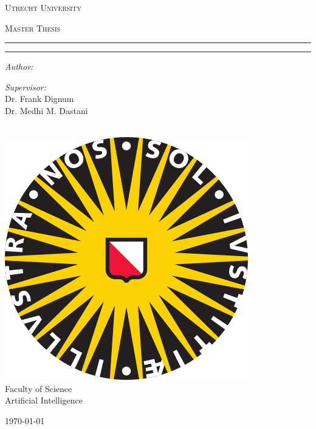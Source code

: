 \makeatletter
\begin{titlepage}
\begin{center}

\vspace*{.06\textheight}
{\scshape\LARGE Utrecht University\par}\vspace{1.5cm} %
\textsc{\Large Master Thesis}\\[0.5cm] %

\hrule
\vspace{0.2cm}
{\huge \bfseries \@title \par}
\vspace{0.4cm} %
\hrule
\vspace{0.2cm}

\begin{minipage}[t]{0.4\textwidth}
\begin{flushleft} \large
\emph{Author:}\\
\@author %
\end{flushleft}
\end{minipage}
\begin{minipage}[t]{0.4\textwidth}
\begin{flushright} \large
\emph{Supervisor:} \\
Dr. Frank Dignum \\
Dr. Medhi M. Dastani
\end{flushright}
\end{minipage}\\[1.5cm]
 
\includegraphics{logo} %
\\[1.0cm]

Faculty of Science \\
Artificial Intelligence\\[2cm] %
 
\vfill

{\large \today}\\[4cm] %
 
\vfill
\end{center}
\end{titlepage}
\makeatother